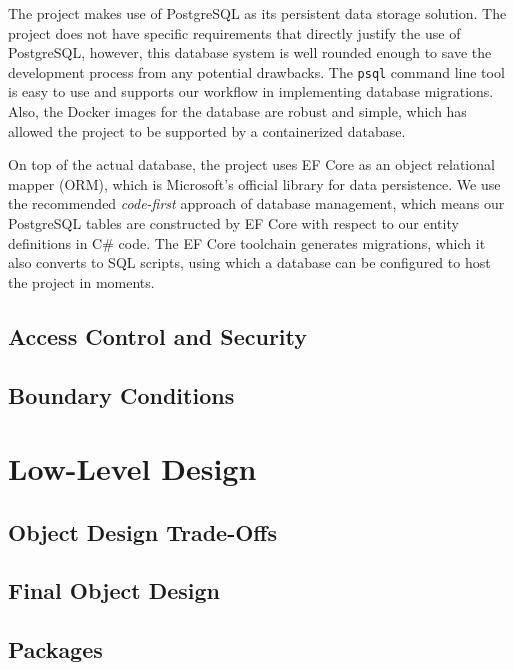 \documentclass[a4paper, 12pt, titlepage]{article}
\begin{document}
  The project makes use of PostgreSQL as its persistent data storage solution.
  The project does not have specific requirements that directly justify the use of PostgreSQL,
  however, this database system is well rounded enough to save the development process from any potential drawbacks.
  The \texttt{psql} command line tool is easy to use and supports our workflow in implementing database migrations.
  Also, the Docker images for the database are robust and simple,
  which has allowed the project to be supported by a containerized database.

  On top of the actual database, the project uses EF Core as an object relational mapper (ORM),
  which is Microsoft's official library for data persistence.
  We use the recommended \textit{code-first} approach of database management, which means our PostgreSQL tables are
  constructed by EF Core with respect to our entity definitions in C\# code.
  The EF Core toolchain generates migrations, which it also converts to SQL scripts,
  using which a database can be configured to host the project in moments.

  \subsection{Access Control and Security}

  \subsection{Boundary Conditions}

  \section{Low-Level Design}

  \subsection{Object Design Trade-Offs}

  \subsection{Final Object Design}

  \subsection{Packages}
\end{document}
